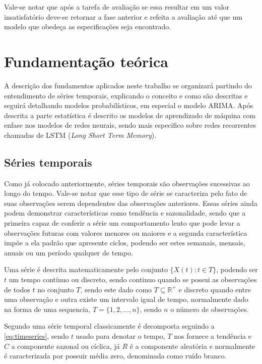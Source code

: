 \documentclass[
	12pt,
	oneside,
	a4paper,
	english,
	brazil
]{abntex2}
\begin{document}
Vale-se notar que após a tarefa de avaliação se essa resultar em um valor 
insatisfatório deve-se retornar a fase anterior e refeita a avaliação até que um 
modelo que obedeça as especificações seja encontrado.

\chapter{Fundamentação teórica}
A descrição dos fundamentos aplicados neste trabalho se organizará partindo do 
entendimento de séries temporais, explicando o conceito e como são descritas e 
seguirá detalhando modelos probabilísticos, em especial o modelo ARIMA\@. Após 
descrita a parte estatística é descrito os modelos de aprendizado de máquina com 
enfase nos modelos de redes neurais, sendo mais especifico sobre redes 
recorrentes chamadas de LSTM (\textit{Long Short Term Memory}).

\section{Séries temporais}

Como já colocado anteriormente, séries temporais são observações sucessivas ao 
longo do tempo. Vale-se notar que esse tipo de série se caracteriza pelo fato de 
suas observações serem dependentes das observações anteriores. Essas séries 
ainda podem demonstrar características como tendência e sazonalidade, sendo que 
a primeira capaz de conferir a série um comportamento lento que pode levar a 
observações futuras com valores menores ou maiores e a segunda característica 
impõe a ela padrão que apresente ciclos, podendo ser estes semanais, mensais, 
anuais ou um período qualquer de tempo.

Uma série é descrita matematicamente pelo conjunto $\{X(t): t \in T\}$, podendo 
ser $t$ um tempo contínuo ou discreto, sendo continuo quando se possui as 
observações de todos $t$ no conjunto $T$, sendo este dado como $T \subseteq 
\mathbb{R}^{+}$ e discreto quando entre uma observação e outra existe um 
intervalo igual de tempo, normalmente dado na forma de uma sequencia, $T = \{1, 
2, \ldots, n\}$, sendo $n$ o número de observações.

Segundo  uma série temporal classicamente é decomposta 
seguindo a \autoref{eq:timeseries}, sendo $t$ usado para denotar o tempo, $T$ 
nos fornece a tendência e $C$ a componente sazonal ou cíclica, já $R$ é a 
componente aleatória e normalmente é caracterizada por possuir média zero, 
denominada como ruído branco.
\end{document}
